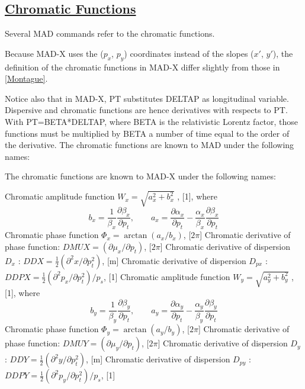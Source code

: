 \subsection{\href{chrom}{Chromatic Functions}} 
\label{subsec:tables_chrom}
Several MAD commands refer to the chromatic functions. 

Because MAD-X uses the ($p_x$, $p_y$) coordinates
instead of the slopes ($x'$, $y'$), the definition of the
chromatic functions in MAD-X differ slightly from those in
\href{bibliography.html#montague}{[Montague]}.  

Notice also that in MAD-X, PT substitutes DELTAP as longitudinal
variable. Dispersive and chromatic functions are hence derivatives with
respects to PT. With PT=BETA*DELTAP, where BETA is the
relativistic Lorentz factor, those functions must be multiplied by BETA
a number of time equal to the order of the derivative. The chromatic
functions are known to MAD under the following names:  

The chromatic functions are known to MAD-X under the following names:

\begin{madlist}
   Chromatic amplitude function $W_x = \sqrt{a_x^2 + b_x^2}$ ,
         [1], where \\
         \[
         b_x = \frac{1}{\beta_x} \frac{\partial \beta_x}{\partial p_t}  ,\qquad
         a_x = \frac{\partial \alpha_x}{\partial p_t} -
         \frac{\alpha_x}{\beta_x}\frac{\partial \beta_x}{\partial p_t}
         \]
   Chromatic phase function $\Phi_x = \arctan (a_x / b_x)$, [$2 \pi$] 
   Chromatic derivative of phase function: 
  $DMUX = (\partial \mu_x / \partial p_t)$,  [$2 \pi$]
   Chromatic derivative of dispersion $D_x$ :  
  $DDX = \frac{1}{2} (\partial^2 x / \partial p_t^2)$, [m]     
   Chromatic derivative of dispersion $D_{px}$ : 
  $DDPX = \frac{1}{2} ( \partial^2 p_x / \partial p_t^2 ) / p_s $, [1]
   Chromatic amplitude function $W_y = \sqrt{a_y^2 + b_y^2}$ ,
         [1], where \\
         \[
         b_y = \frac{1}{\beta_y} \frac{\partial \beta_y}{\partial p_t} ,\qquad
         a_y = \frac{\partial \alpha_y}{\partial p_t} -
         \frac{\alpha_y}{\beta_y}\frac{\partial \beta_y}{\partial p_t}
         \]
   Chromatic phase function $\Phi_y = \arctan (a_y / b_y)$, [$2 \pi$]
   Chromatic derivative of phase function:
  $DMUY = (\partial \mu_y / \partial p_t)$,  [$2 \pi$] 
   Chromatic derivative of dispersion $D_y$ : 
  $DDY = \frac{1}{2} (\partial^2 y / \partial p_t^2)$, [m]      
   Chromatic derivative of dispersion $D_{py}$ : 
  $DDPY = \frac{1}{2} ( \partial^2 p_y / \partial p_t^2 ) / p_s $, [1] 
\end{madlist}

